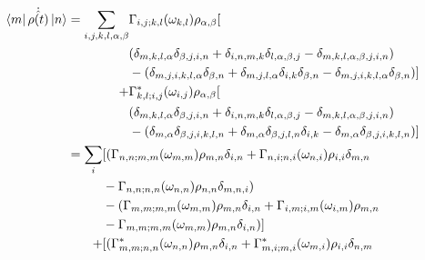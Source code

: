 \begin{align}
    \bra{m}\dot{\hat{\rho{}(t)}} \ket{n} & = \begin{aligned}[t]
        \sum_{i,j,k, l, \alpha, \beta} &
        \Gamma_{i,j;k, l}(\omega_{k,l})
        \rho_{\alpha, \beta} [                             \\
                                       &
            (\delta_{m, k, l, \alpha}\delta_{\beta, j,i, n}
            + \delta_{i, n, m, k}\delta_{l, \alpha, \beta, j}
        - \delta_{m, k, l, \alpha, \beta, j,i, n})         \\
                                       &
            - (    \delta_{m, j,i, k,l, \alpha}\delta_{\beta, n}
            + \delta_{m, j,l, \alpha}\delta_{i, k}\delta_{\beta, n}
        - \delta_{m, j,i, k, l, \alpha}\delta_{\beta, n})] \\
        +                              &
        \Gamma^*_{k, l; i,j}(\omega_{i,j})
        \rho_{\alpha, \beta} [                             \\
                                       &
            (\delta_{m, k, l, \alpha}\delta_{\beta, j,i, n}
            + \delta_{i, n, m, k}\delta_{l, \alpha, \beta, j}
        - \delta_{m, k, l, \alpha, \beta, j,i, n})         \\
                                       &
            - (\delta_{m, \alpha}\delta_{\beta, j,i, k, l, n}
            + \delta_{m, \alpha}\delta_{\beta, j,l, n}
            \delta_{i, k}
            - \delta_{m, \alpha}\delta_{\beta, j,i, k,l, n})]
    \end{aligned}  \\
                                         & = \begin{aligned}[t]
        \sum_{i} &
        [ (\Gamma_{n,n;m, m}(\omega_{m,m})\rho_{m, n}\delta_{i,n}
        + \Gamma_{n,i;n, i}(\omega_{n,i})\rho_{i, i}\delta_{m,n}     \\ &
        - \Gamma_{n,n;n,n}(\omega_{n,n})\rho_{n,n}\delta_{m,n,i})    \\
                 &
                - (\Gamma_{m,m;m,m}(\omega_{m,m})\rho_{m, n}\delta_{i,n}
        +\Gamma_{i,m;i, m}(\omega_{i,m})\rho_{m, n}                  \\ &
        -\Gamma_{m,m;m,m}(\omega_{m,m})\rho_{m, n}\delta_{i,n})]     \\
        +        &
        [(\Gamma^*_{m,m; n,n}(\omega_{n,n})\rho_{m, n}\delta_{i,n}
        + \Gamma^*_{m,i; m,i}(\omega_{m,i})\rho_{i, i}\delta_{n, m}  \\ &

\end{aligned}
\end{align}
